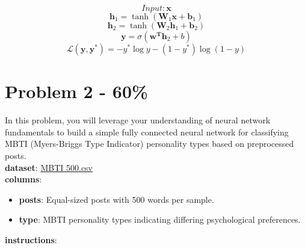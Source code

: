\documentclass{article}
\begin{document}
$$Input: \mathbf{x}$$
$$\mathbf{h}_{1}=\tanh(\mathbf{W}_{1}\mathbf{x}+\mathbf{b}_{1})$$
$$\mathbf{h}_{2}=\tanh(\mathbf{W}_{2}\mathbf{h}_{1}+\mathbf{b}_{2})$$
$$\mathbf{y}=\sigma(\mathbf{w}^{\mathbf{T}}\mathbf{h}_{2}+b)$$
$$\mathcal{L}(\mathbf{y}, \mathbf{y}^*) = -y^*\log y - (1-y^*)\log (1-y) $$
\section*{Problem 2 - 60\%}
In this problem, you will leverage your understanding of neural network fundamentals to build a simple fully connected neural network for classifying MBTI (Myers-Briggs Type Indicator) personality types based on preprocessed posts.
\\
\newline
\textbf{dataset}: \href{https://drive.google.com/file/d/1CHuGdZKJJRl_IRdxa3MBv4SqEJVUhK73/view?usp=sharing}{MBTI 500.csv}
\\
\textbf{columns}:
\begin{itemize}
    \item \textbf{posts}: Equal-sized posts with 500 words per sample.
    \item \textbf{type}: MBTI personality types indicating differing psychological preferences.
\end{itemize}
\textbf{instructions}:
\end{document}
